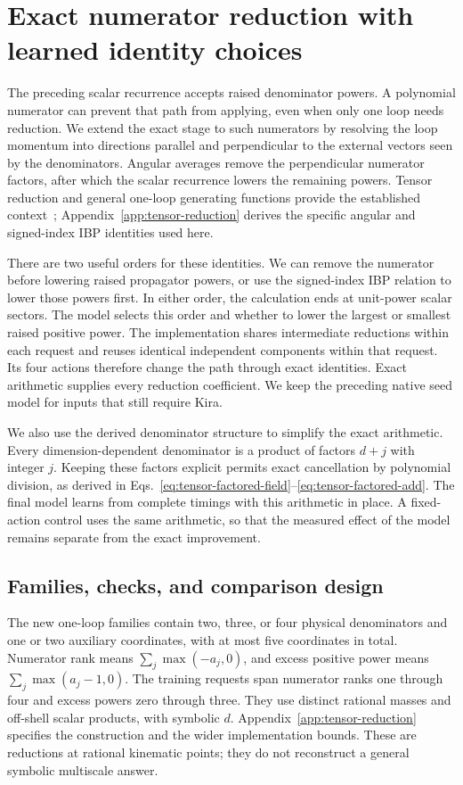 \section{Exact numerator reduction with learned identity choices}
\label{sec:tensor-results}
The preceding scalar recurrence accepts raised denominator powers. A polynomial numerator can prevent that path from applying, even when only one loop needs reduction. We extend the exact stage to such numerators by resolving the loop momentum into directions parallel and perpendicular to the external vectors seen by the denominators. Angular averages remove the perpendicular numerator factors, after which the scalar recurrence lowers the remaining powers. Tensor reduction and general one-loop generating functions provide the established context~\cite{DennerDittmaier2006,Hu2025}; Appendix~\ref{app:tensor-reduction} derives the specific angular and signed-index IBP identities used here.

There are two useful orders for these identities. We can remove the numerator before lowering raised propagator powers, or use the signed-index IBP relation to lower those powers first. In either order, the calculation ends at unit-power scalar sectors. The model selects this order and whether to lower the largest or smallest raised positive power. The implementation shares intermediate reductions within each request and reuses identical independent components within that request. Its four actions therefore change the path through exact identities. Exact arithmetic supplies every reduction coefficient. We keep the preceding native seed model for inputs that still require Kira.

We also use the derived denominator structure to simplify the exact arithmetic. Every dimension-dependent denominator is a product of factors $d+j$ with integer $j$. Keeping these factors explicit permits exact cancellation by polynomial division, as derived in Eqs.~\eqref{eq:tensor-factored-field}--\eqref{eq:tensor-factored-add}. The final model learns from complete timings with this arithmetic in place. A fixed-action control uses the same arithmetic, so that the measured effect of the model remains separate from the exact improvement.

\subsection{Families, checks, and comparison design}
The new one-loop families contain two, three, or four physical denominators and one or two auxiliary coordinates, with at most five coordinates in total. Numerator rank means $\sum_j\max(-a_j,0)$, and excess positive power means $\sum_j\max(a_j-1,0)$. The training requests span numerator ranks one through four and excess powers zero through three. They use distinct rational masses and off-shell scalar products, with symbolic $d$. Appendix~\ref{app:tensor-reduction} specifies the construction and the wider implementation bounds. These are reductions at rational kinematic points; they do not reconstruct a general symbolic multiscale answer.

